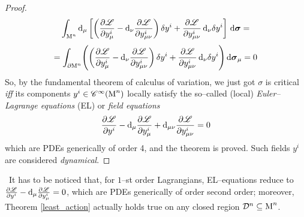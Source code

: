 \begin{proof}
$$\int_{\text{\normalfont M}^n}\text{\normalfont d}_\mu\left[\left(\frac{\partial\mathscr{L}}{\partial y^i_\mu}-\text{\normalfont d}_\nu\frac{\partial\mathscr{L}}{\partial y^i_{\mu\nu}}\right)\delta y^i+\frac{\partial\mathscr{L}}{\partial y^i_{\mu\nu}}\,\text{\normalfont d}_\nu\delta y^i\right]\,\text{\normalfont d}\boldsymbol{\sigma}=$$
$$=\int_{\partial\text{\normalfont M}^n}\Biggl(\left(\frac{\partial\mathscr{L}}{\partial y^i_\mu}-\text{\normalfont d}_\nu\frac{\partial\mathscr{L}}{\partial y^i_{\mu\nu}}\right)\delta y^i+\frac{\partial\mathscr{L}}{\partial y^i_{\mu\nu}}\,\text{\normalfont d}_\nu\delta y^i\Biggl)\,\text{\normalfont d}\boldsymbol{\sigma}_\mu=0$$
So, by the fundamental theorem of calculus of variation, we just got $\sigma$ is critical \emph{iff} its components $y^i\in\mathscr{C}^\infty(\text{\normalfont M}^n)$ locally satisfy the so--called (local) \emph{Euler--Lagrange equations} (EL) or \emph{field equations}
$$\frac{\partial\mathscr{L}}{\partial y^i}-\text{\normalfont d}_\mu\frac{\partial\mathscr{L}}{\partial y^i_\mu}+\text{\normalfont d}_{\mu\nu}\frac{\partial\mathscr{L}}{\partial y^i_{\mu\nu}}=0$$
which are PDEs generically of order 4, and the theorem is proved. Such fields $y^i$ are considered \emph{dynamical}.
\end{proof}
\,\newline
 It has to be noticed that, for $1$--st order Lagrangians, EL--equations reduce to $\frac{\partial\mathscr{L}}{\partial y^i}-\text{\normalfont d}_\mu\frac{\partial\mathscr{L}}{\partial y^i_\mu}=0$, which are PDEs generically of order second order; moreover, Theorem \ref{least_action} actually holds true on any closed region $\mathcal{D}^n\subseteq\text{\normalfont M}^n$.

